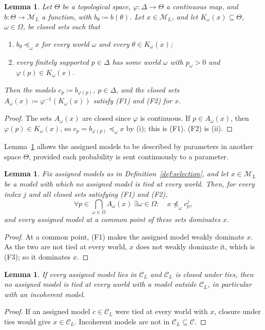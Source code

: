 \documentclass[11pt]{article}
\newtheorem{lemma}[theorem]{Lemma}
\theoremstyle{definition}
\theoremstyle{remark}
\newcommand{\M}{\mathcal M}
\newcommand{\C}{\mathcal C}
\begin{document}
\begin{lemma}\label{lem:reindex}
Let $\Theta$ be a topological space, $\varphi:\Delta\to\Theta$ a continuous map, and $b:\Theta\to\M_L$ a function, with $b_\theta\coloneqq b(\theta)$. Let $x\in\M_L$, and let $K_\omega(x)\subseteq\Theta$, $\omega\in\Omega$, be closed sets such that
\begin{enumerate}[label=(\roman*)]
\item $b_\theta\preceq_\omega x$ for every world $\omega$ and every $\theta\in K_\omega(x)$;
\item every finitely supported $p\in\Delta$ has some world $\omega$ with $p_\omega>0$ and $\varphi(p)\in K_\omega(x)$.
\end{enumerate}
Then the models $c_p\coloneqq b_{\varphi(p)}$, $p\in\Delta$, and the closed sets $A_\omega(x)\coloneqq\varphi^{-1}(K_\omega(x))$ satisfy (F1) and (F2) for $x$.
\end{lemma}
\begin{proof}
The sets $A_\omega(x)$ are closed since $\varphi$ is continuous. If $p\in A_\omega(x)$, then $\varphi(p)\in K_\omega(x)$, so $c_p=b_{\varphi(p)}\preceq_\omega x$ by (i); this is (F1). (F2) is (ii).
\end{proof}
Lemma~\ref{lem:reindex} allows the assigned models to be described by parameters in another space $\Theta$, provided each probability is sent continuously to a parameter.
\endgroup

\begingroup\color{red}
\begin{lemma}\label{lem:no-tie}
Fix assigned models as in Definition~\ref{def:selection}, and let $x\in\M_L$ be a model with which no assigned model is tied at every world. Then, for every index $j$ and all closed sets satisfying (F1) and (F2),
\begin{equation}
\forall p\in\bigcap_{\omega\in\Omega}A_\omega(x)\ \exists\omega\in\Omega:\quad x\not\preceq_\omega c^j_p,\tag{F3}\label{eq:f-notie}
\end{equation}
and every assigned model at a common point of these sets dominates $x$.
\end{lemma}
\begin{proof}
At a common point, (F1) makes the assigned model weakly dominate $x$. As the two are not tied at every world, $x$ does not weakly dominate it, which is (F3); so it dominates $x$.
\end{proof}

\begin{lemma}\label{lem:tie-sufficient}
If every assigned model lies in $\C_L$ and $\C_L$ is closed under ties, then no assigned model is tied at every world with a model outside $\C_L$, in particular with an incoherent model.
\end{lemma}
\begin{proof}
If an assigned model $c\in\C_L$ were tied at every world with $x$, closure under ties would give $x\in\C_L$. Incoherent models are not in $\C_L\subseteq\C$.
\end{proof}
\end{document}
